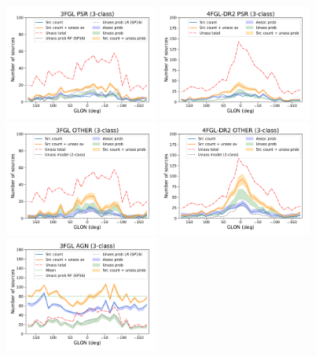 \documentclass{aa}
\begin{document}
\begin{figure}[h]
\centering
\includegraphics[width=0.45\textwidth]{plots/lon_profile_PSR_3FGL_3classes.pdf}
\includegraphics[width=0.45\textwidth]{plots/lon_profile_PSR_4FGL-DR2_3classes.pdf} \\
\includegraphics[width=0.45\textwidth]{plots/lon_profile_OTHER_3FGL_3classes.pdf}
\includegraphics[width=0.45\textwidth]{plots/lon_profile_OTHER_4FGL-DR2_3classes.pdf} \\
\includegraphics[width=0.45\textwidth]{plots/lon_profile_AGN_3FGL_3classes.pdf}

\end{figure}
\end{document}
